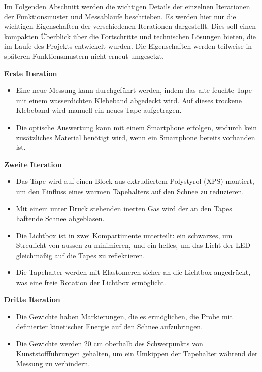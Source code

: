 Im Folgenden Abschnitt werden die wichtigen Details der einzelnen Iterationen der Funktionsmuster und Messabläufe beschrieben. Es werden hier nur die wichtigen Eigenschaften der verschiedenen Iterationen dargestellt. Dies soll einen kompakten Überblick über die Fortschritte und technischen Lösungen bieten, die im Laufe des Projekts entwickelt wurden. Die Eigenschaften werden teilweise in späteren Funktionsmustern nicht erneut umgesetzt.


\textbf{Erste Iteration}

\begin{itemize}
    \item Eine neue Messung kann durchgeführt werden, indem das alte feuchte Tape mit einem wasserdichten Klebeband abgedeckt wird. Auf dieses trockene Klebeband wird manuell ein neues Tape aufgetragen.
    \item Die optische Auswertung kann mit einem Smartphone erfolgen, wodurch kein zusätzliches Material benötigt wird, wenn ein Smartphone bereits vorhanden ist.
\end{itemize}

\textbf{Zweite Iteration}

\begin{itemize}
    
    \item Das Tape wird auf einen Block aus extrudiertem Polystyrol (XPS) montiert, um den Einfluss eines warmen Tapehalters auf den Schnee zu reduzieren.
    \item Mit einem unter Druck stehenden inerten Gas wird der an den Tapes haftende Schnee abgeblasen.
    \item Die Lichtbox ist in zwei Kompartimente unterteilt: ein schwarzes, um Streulicht von aussen zu minimieren, und ein helles, um das Licht der LED gleichmäßig auf die Tapes zu reflektieren.
    \item Die Tapehalter werden mit Elastomeren sicher an die Lichtbox angedrückt, was eine freie Rotation der Lichtbox ermöglicht.

\end{itemize}

\textbf{Dritte Iteration}

\begin{itemize}
    \item Die Gewichte haben Markierungen, die es ermöglichen, die Probe mit definierter kinetischer Energie auf den Schnee aufzubringen.
    \item Die Gewichte werden 20 cm oberhalb des Schwerpunkts von Kunststoffführungen gehalten, um ein Umkippen der Tapehalter während der Messung zu verhindern.
\end{itemize}

